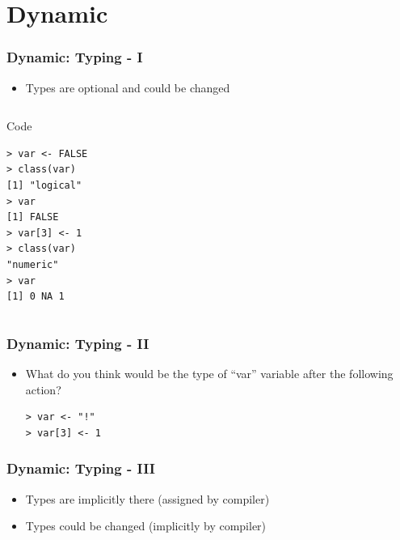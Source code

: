 \documentclass[bigger]{beamer}
\begin{document}
\section{Dynamic}
\label{sec-4}
\begin{frame}[fragile,t]
\frametitle{Dynamic: Typing - I}
\label{sec-4-1}
\begin{itemize}

\item Types are optional and could be changed
\label{sec-4-1-1}%
\end{itemize} %
\begin{columns}
\begin{column}{0.6\textwidth}
\begin{block}{Code}
\label{sec-4-1-2}


\begin{verbatim}
> var <- FALSE
> class(var)
[1] "logical"
> var
[1] FALSE
> var[3] <- 1
> class(var)
"numeric"
> var
[1] 0 NA 1
\end{verbatim}
\end{block}
\end{column}
\end{columns}
\end{frame}
\begin{frame}[fragile]
\frametitle{Dynamic: Typing - II}
\label{sec-4-2}
\begin{itemize}

\item What do you think would be the type of ``var'' variable after the following action?\\
\label{sec-4-2-1}%
\begin{verbatim}
> var <- "!"
> var[3] <- 1
\end{verbatim}


\end{itemize} %
\end{frame}
\begin{frame}
\frametitle{Dynamic: Typing - III}
\label{sec-4-3}
\begin{itemize}

\item Types are implicitly there (assigned by compiler)
\label{sec-4-3-1}%

\item Types could be changed (implicitly by compiler)
\label{sec-4-3-2}%
\end{itemize} %
\end{frame}
\end{document}
